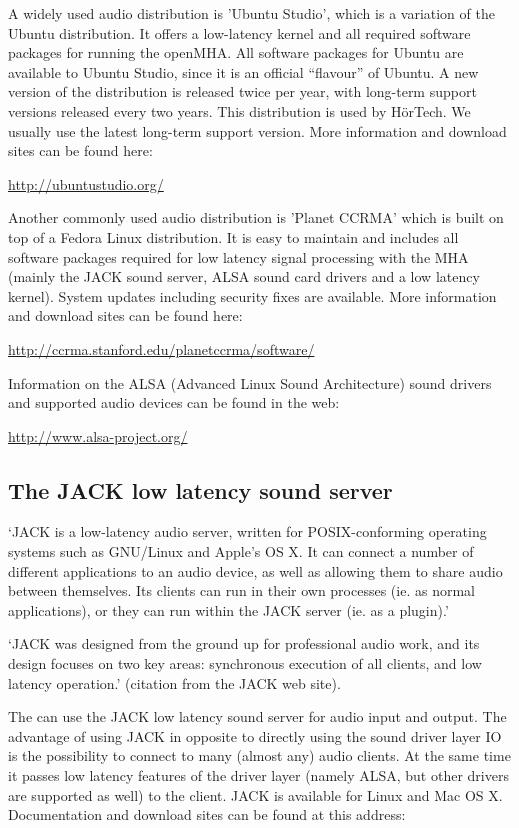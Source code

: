 A widely used audio distribution is 'Ubuntu Studio',
which is a variation of the Ubuntu distribution.
%
It offers a low-latency kernel and all required software packages for
running the openMHA.
%
All software packages for Ubuntu are available to Ubuntu Studio, since
it is an official ``flavour'' of Ubuntu.
%
A new version of the distribution is released twice per year, with
long-term support versions released every two years.
%
This distribution is used by H\"orTech.
%
We usually use the latest long-term support version.
%
More information and download sites can be found here:

\url{http://ubuntustudio.org/}

Another commonly used audio distribution is
'Planet CCRMA' which is built on top of a
Fedora Linux distribution.
%
It is easy to maintain and includes all software packages required for
low latency signal processing with the MHA (mainly
the JACK sound server, ALSA sound card drivers
and a low latency kernel).
%
System updates including security fixes are available.
%
More information and download sites can be found here:

\url{http://ccrma.stanford.edu/planetccrma/software/}

Information on the ALSA (Advanced Linux Sound Architecture) sound
drivers and supported audio devices can be found in the web:

\url{http://www.alsa-project.org/}


\subsection{The JACK low latency sound server}
\label{sec:jack}

`JACK is a low-latency audio server, written for POSIX-conforming
operating systems such as GNU/Linux and Apple's OS X. It can connect a
number of different applications to an audio device, as well as
allowing them to share audio between themselves. Its clients can run
in their own processes (ie. as normal applications), or they can run
within the JACK server (ie. as a plugin).'

`JACK was designed from the ground up for professional audio work, and
its design focuses on two key areas: synchronous execution of all
clients, and low latency operation.' (citation from the JACK web site).

The \mhad{} can use the JACK low latency sound
server for audio input and output.
%
The advantage of using JACK in opposite to directly using the sound
driver layer IO is the possibility to connect to many (almost any)
audio clients.
%
At the same time it passes low latency features of the driver layer
(namely ALSA, but other drivers are supported as well) to the client.
%
JACK is available for Linux and Mac OS X. Documentation and download
sites can be found at this address:

